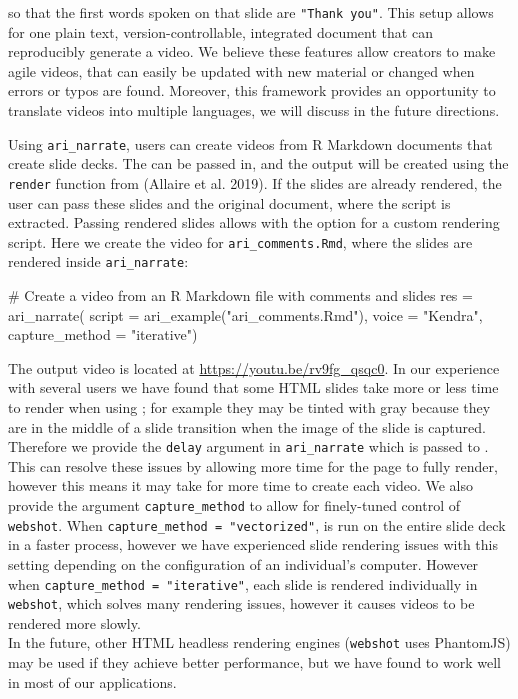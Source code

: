 so that the first words spoken on that slide are \texttt{"Thank\ you"}.
This setup allows for one plain text, version-controllable, integrated
document that can reproducibly generate a video. We believe these
features allow creators to make agile videos, that can easily be updated
with new material or changed when errors or typos are found. Moreover,
this framework provides an opportunity to translate videos into multiple
languages, we will discuss in the future directions.

Using \texttt{ari\_narrate}, users can create videos from R Markdown
documents that create slide decks. The can be passed in, and the output
will be created using the \texttt{render} function from 
(Allaire et al. 2019). If the slides are already rendered, the user can
pass these slides and the original document, where the script is
extracted. Passing rendered slides allows with the option for a custom
rendering script. Here we create the video for
\texttt{ari\_comments.Rmd}, where the slides are rendered inside
\texttt{ari\_narrate}:

\begin{Schunk}
\begin{Sinput}
# Create a video from an R Markdown file with comments and slides
res = ari_narrate(
  script = ari_example("ari_comments.Rmd"),
  voice = "Kendra",
  capture_method = "iterative")
\end{Sinput}
\end{Schunk}

The output video is located at \url{https://youtu.be/rv9fg_qsqc0}. In
our experience with several users we have found that some HTML slides
take more or less time to render when using ; for example
they may be tinted with gray because they are in the middle of a slide
transition when the image of the slide is captured. Therefore we provide
the \texttt{delay} argument in \texttt{ari\_narrate} which is passed to
. This can resolve these issues by allowing more time for
the page to fully render, however this means it may take for more time
to create each video. We also provide the argument
\texttt{capture\_method} to allow for finely-tuned control of
\texttt{webshot}. When \texttt{capture\_method\ =\ "vectorized"},
 is run on the entire slide deck in a faster process,
however we have experienced slide rendering issues with this setting
depending on the configuration of an individual's computer. However when
\texttt{capture\_method\ =\ "iterative"}, each slide is rendered
individually in \texttt{webshot}, which solves many rendering issues,
however it causes videos to be rendered more slowly.\\
In the future, other HTML headless rendering engines (\texttt{webshot}
uses PhantomJS) may be used if they achieve better performance, but we
have found  to work well in most of our applications.

